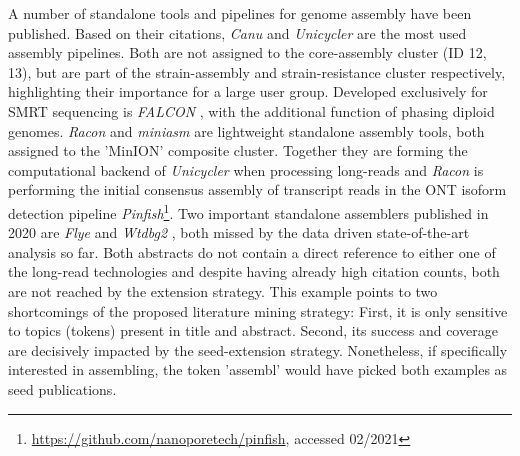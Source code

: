 A number of standalone tools and pipelines for genome assembly have been published.
Based on their citations, \textit{Canu} \cite{Koren2017} and \textit{Unicycler} \cite{Wick2017} are the most used assembly pipelines. Both are not assigned to the core-assembly cluster (ID 12, 13), but are part of the strain-assembly and strain-resistance cluster respectively, highlighting their importance for a large user group.
Developed exclusively for SMRT sequencing is \textit{FALCON} \cite{Chin2016}, with the additional function of phasing diploid genomes.
\textit{Racon} \cite{Vaser2017} and \textit{miniasm} \cite{Li2016} are lightweight standalone assembly tools, both assigned to the 'MinION' composite cluster. 
Together they are forming the computational backend of \textit{Unicycler} when processing long-reads and \textit{Racon} is performing the initial consensus assembly of transcript reads in the ONT isoform detection pipeline \textit{Pinfish}\footnote{\url{https://github.com/nanoporetech/pinfish}, accessed 02/2021}.
Two important standalone assemblers published in 2020 are \textit{Flye} \cite{Kolmogorov2019} and \textit{Wtdbg2} \cite{Ruan2020}, both missed by the data driven state-of-the-art analysis so far.
Both abstracts do not contain a direct reference to either one of the long-read technologies and despite having already high citation counts, both are not reached by the extension strategy.
This example points to two shortcomings of the proposed literature mining strategy: First, it is only sensitive to topics (tokens) present in title and abstract.
Second, its success and coverage are decisively impacted by the seed-extension strategy.
Nonetheless, if specifically interested in assembling, the token 'assembl' would have picked both examples as seed publications.

